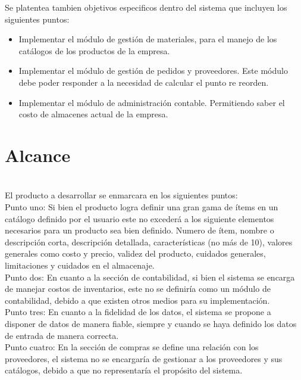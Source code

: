 Se platentea tambien objetivos especificos dentro del sistema que incluyen los siguientes puntos:

\begin{itemize}
\item Implementar el módulo de gestión de materiales, para el manejo de los catálogos de los productos de la empresa.
\item Implementar el módulo de gestión de pedidos y proveedores. Este módulo debe poder responder a la necesidad de calcular el punto re reorden.
\item Implementar el módulo de administración contable. Permitiendo saber el costo de almacenes actual de la empresa.
\end{itemize}


\section{Alcance}

\\
El producto a desarrollar se enmarcara en los siguientes puntos:\\

Punto uno: Si bien el producto logra definir una gran gama de ítems en un catálogo definido por el usuario este no excederá a los siguiente elementos necesarios para un producto sea bien definido. Numero de ítem, nombre o descripción corta, descripción detallada, características (no más de 10), valores generales como costo y precio, validez del producto, cuidados generales, limitaciones y cuidados en el almacenaje.\\

Punto dos: En cuanto a la sección de contabilidad, si bien el sistema se encarga de manejar costos de inventarios, este no se definiría como un módulo de contabilidad, debido a que existen otros medios para su implementación.\\

Punto tres: En cuanto a la fidelidad de los datos, el sistema se propone a disponer de datos de manera fiable, siempre y cuando se haya definido los datos de entrada de manera correcta.\\

Punto cuatro: En la sección de compras se define una relación con los proveedores, el sistema no se encargaría de gestionar a los proveedores y sus catálogos, debido a que no representaría el propósito del sistema.\\

